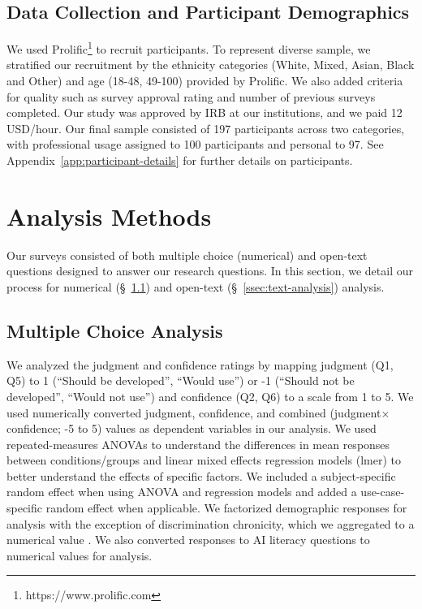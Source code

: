 \subsection{Data Collection and Participant Demographics}
\label{ssec:data-and-demographics}
We used Prolific\footnote{https://www.prolific.com} to recruit participants. To represent diverse sample, we stratified our recruitment by the ethnicity categories (White, Mixed, Asian, Black and Other) and age (18-48, 49-100) provided by Prolific. We also added criteria for quality such as survey approval rating and number of previous surveys completed.
Our study was approved by IRB at our institutions, and we paid 12 USD/hour. Our final sample consisted of 197 participants across two categories, with professional usage assigned to 100 participants and personal to 97. See Appendix~\ref{app:participant-details} for further details on participants.

\section{Analysis Methods}
Our surveys consisted of both multiple choice (numerical) and open-text questions designed to answer our research questions. In this section, we detail our process for numerical (\S~\ref{ssec:num-analysis}) and open-text (\S~\ref{ssec:text-analysis}) analysis.

\subsection{Multiple Choice Analysis}
\label{ssec:num-analysis}
We analyzed the judgment and confidence ratings by mapping judgment (Q1, Q5) to 1 (``Should be developed'', ``Would use'') or -1 (``Should not be developed'', ``Would not use'') and confidence (Q2, Q6) to a scale from 1 to 5. We used numerically converted judgment, confidence, and combined (judgment$\times$confidence; -5 to 5) values as dependent variables in our analysis. We used repeated-measures ANOVAs to understand the differences in mean responses between conditions/groups and linear mixed effects regression models (lmer) to better understand the effects of specific factors. We included a subject-specific random effect when using ANOVA and regression models and added a use-case-specific random effect when applicable. We factorized demographic responses for analysis with the exception of discrimination chronicity, which we aggregated to a numerical value \citep{kingsley2024investigating, michaels2019coding}. We also converted responses to AI literacy questions to numerical values for analysis. 
